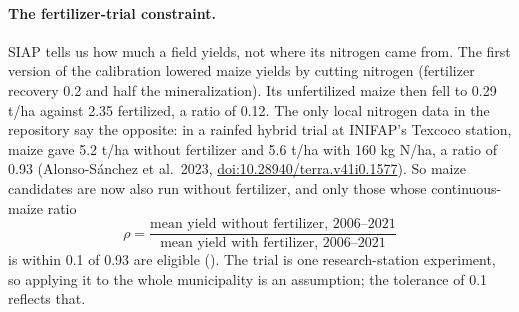\documentclass[11pt,a4paper]{article}
\newcommand{\code}[1]{\texttt{\detokenize{#1}}}
\begin{document}
\paragraph{The fertilizer-trial constraint.} SIAP tells us how much a field yields, not where its nitrogen came from.
The first version of the calibration lowered maize yields by cutting nitrogen (fertilizer recovery 0.2 and half the
mineralization). Its unfertilized maize then fell to 0.29 t/ha against 2.35 fertilized, a ratio of 0.12. The only
local nitrogen data in the repository say the opposite: in a rainfed hybrid trial at INIFAP's Texcoco station,
maize gave 5.2 t/ha without fertilizer and 5.6 t/ha with 160 kg N/ha, a ratio of 0.93 (Alonso-Sánchez et al.\ 2023,
\href{https://doi.org/10.28940/terra.v41i0.1577}{doi:10.28940/terra.v41i0.1577}). So maize candidates are now also
run without fertilizer, and only those whose continuous-maize ratio
\begin{equation}
  \rho = \frac{\text{mean yield without fertilizer, 2006--2021}}{\text{mean yield with fertilizer, 2006--2021}}
\end{equation}
is within 0.1 of 0.93 are eligible (\code{within_trial}). The trial is one research-station experiment, so applying it
to the whole municipality is an assumption; the tolerance of 0.1 reflects that.
\end{document}
